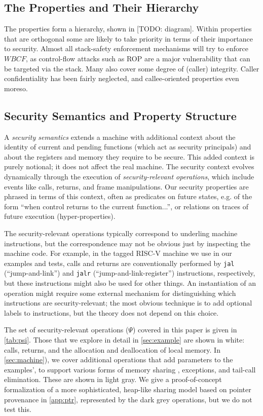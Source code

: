 \subsection{The Properties and Their Hierarchy}

The properties form a hierarchy, shown in [TODO: diagram].
Within properties that are orthogonal
some are likely to take priority in terms of their
importance to security. Almost all stack-safety enforcement mechanisms will try to enforce \(WBCF\),
as control-flow attacks such as ROP are a major vulnerability that can be targeted via the stack.
Many also cover some degree of (caller) integrity. Caller confidentiality has been fairly neglected,
and callee-oriented properties even moreso.

\subsection{Security Semantics and Property Structure}

A {\it security semantics} extends a machine
with additional context about the identity of current and pending
functions (which act as security principals) and about the registers and memory they require
to be secure. This added context is purely notional;
it does not affect the real machine. The security context
evolves dynamically through the execution of {\it security-relevant operations},
which include events like calls, returns, and frame manipulations.
Our security properties are phrased in terms of this context, often as predicates
on future states, e.g. of the form ``when control returns to the current function...'',
or relations on traces of future execution (hyper-properties).

The security-relevant operations typically correspond to underling machine instructions,
but the correspondence may not be obvious just by inspecting the machine code.
For example, in the tagged RISC-V machine we use in our examples and tests,
calls and returns are conventionally performed by {\tt jal} (``jump-and-link'')
and {\tt jalr} (``jump-and-link-register'') instructions, respectively, but these
instructions might also be used for other things. An instantiation of an operation
might require some external mechanism for distinguishing which instructions are
security-relevant; the most obvious technique is to add optional labels to instructions,
but the theory does not depend on this choice.

The set of security-relevant operations (\(\Psi\)) covered in this paper is given in
\cref{tab:psi}. Those that we explore in detail in \cref{sec:example}
are shown in white: calls, returns, and the allocation and deallocation of local memory.
In \cref{sec:machine}), we cover additional operations that add parameters to the examples',
to support various forms of memory sharing \ifexceptions , exceptions, \fi
and tail-call elimination. These are shown in light gray.
We give a proof-of-concept formalization of a more sophisticated, heap-like sharing model
based on pointer provenance in \cref{app:ptr}, represented by the dark grey
operations, but we do not test this.

